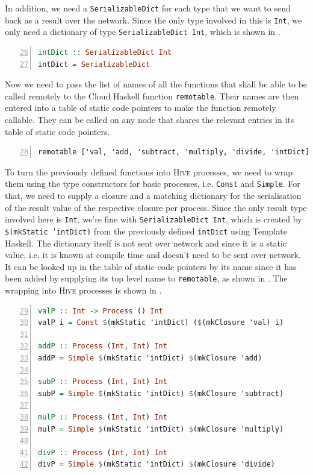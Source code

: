 In addition, we need a \texttt{SerializableDict} for each type that we want to send back as a result over the network. Since the only type involved in this is \texttt{Int}, we only need a dictionary of type \texttt{SerializableDict Int}, which is shown in .
\begin{lstlisting}[language=Haskell, caption=\texttt{SerializableDict} for values of type \texttt{Int}., label=lst:arith_dict, numbers=left, frame=bt, firstnumber=26]
intDict :: SerializableDict Int
intDict = SerializableDict
\end{lstlisting}

Now we need to pass the list of names of all the functions that shall be able to be called remotely to the \textsf{Cloud Haskell} function \texttt{remotable}. Their names are then entered into a table of static code pointers to make the function remotely callable. They can be called on any node that shares the relevant entries in its table of static code pointers.
\begin{lstlisting}[language=Haskell, caption=Making functions remotely callable., label=lst:arith_remotable, numbers=left, frame=bt, firstnumber=28]
remotable ['val, 'add, 'subtract, 'multiply, 'divide, 'intDict]
\end{lstlisting}

To turn the previously defined functions into \textsc{Hive} processes, we need to wrap them using the type constructors for basic processes, i.e. \texttt{Const} and \texttt{Simple}. For that, we need to supply a closure and a matching dictionary for the serialisation of the result value of the respective closure per process. Since the only result type involved here is \texttt{Int}, we're fine with \texttt{SerializableDict Int}, which is created by \texttt{\$(mkStatic 'intDict)} from the previously defined \texttt{intDict} using \textsf{Template Haskell}. The dictionary itself is not sent over network and since it is a static value, i.e. it is known at compile time and doesn't need to be sent over network. It can be looked up in the table of static code pointers by its name since it has been added by supplying its top level name to \texttt{remotable}, as shown in . The wrapping into \textsc{Hive} processes is shown in .
\begin{lstlisting}[language=Haskell, caption=Creating function closures and wrapping them into \textsc{Hive} processes., label=lst:arith_wrapping, numbers=left, frame=bt, firstnumber=29]
valP :: Int -> Process () Int
valP i = Const $(mkStatic 'intDict) ($(mkClosure 'val) i)

addP :: Process (Int, Int) Int
addP = Simple $(mkStatic 'intDict) $(mkClosure 'add)

subP :: Process (Int, Int) Int
subP = Simple $(mkStatic 'intDict) $(mkClosure 'subtract)

mulP :: Process (Int, Int) Int
mulP = Simple $(mkStatic 'intDict) $(mkClosure 'multiply)

divP :: Process (Int, Int) Int
divP = Simple $(mkStatic 'intDict) $(mkClosure 'divide)
\end{lstlisting}

